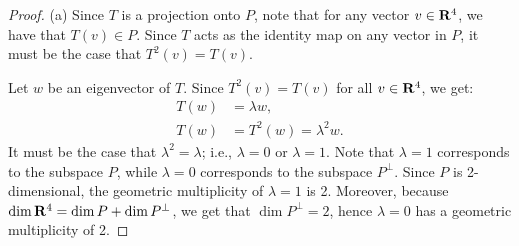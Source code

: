\documentclass[10pt,twoside,openany]{memoir}
\begin{document}
    {\color{blue} \begin{proof}
        (a) Since $T$ is a projection onto $P$, note that for any vector $v \in \mathbf{R}^4$, we have that $T(v) \in P$. Since $T$ acts as the identity map on any vector in $P$, it must be the case that $T^2(v) = T(v)$. 

        Let $w$ be an eigenvector of $T$. Since $T^2(v) = T(v)$ for all $v \in \mathbf{R}^4$, we get:
            \begin{equation*}
            \begin{split}
                T(w) &= \lambda w, \\
                T(w) & = T^2(w)  = \lambda^2 w.
            \end{split}
            \end{equation*}
        It must be the case that $\lambda^2 = \lambda$; i.e., $\lambda = 0$ or $\lambda = 1$. Note that $\lambda = 1$ corresponds to the subspace $P$, while $\lambda = 0$ corresponds to the subspace $P^\perp$. Since $P$ is 2-dimensional, the geometric multiplicity of $\lambda = 1$ is 2. Moreover, because $\dim \mathbf{R}^4 = \dim P + \dim P^\perp$, we get that $\dim P^\perp = 2$, hence $\lambda = 0$ has a geometric multiplicity of 2.


\end{proof}}
\end{document}
